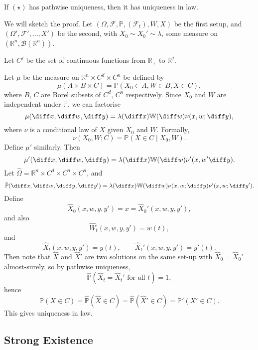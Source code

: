 \documentclass[12pt]{article}
\begin{document}
\begin{theorem}
	If $(\star)$ has pathwise uniqueness, then it has uniqueness in law.
\end{theorem}

\begin{proofbox}
	We will sketch the proof. Let $(\Omega, \mathcal{F}, \mathbb{P}, (\mathcal{F}_t), W, X)$ be the first setup, and $(\Omega', \mathcal{F}', \ldots, X')$ be the second, with $X_0 \sim X_0' \sim \lambda$, some measure on $(\mathbb{R}^{n}, \mathcal{B}(\mathbb{R}^{n}))$.

	Let $C^{j}$ be the set of continuous functions from $\mathbb{R}_+$ to $\mathbb{R}^{j}$.

	Let $\mu$ be the measure on $\mathbb{R}^{n} \times C^{d} \times C^{n}$ be defined by
	\[
		\mu(A \times B \times C) = \mathbb{P}(X_0 \in A, W \in B, X \in C),
	\]
	where $B$, $C$ are Borel subsets of $C^{d}$, $C^{n}$ respectively. Since $X_0$ and $W$ are independent under $\mathbb{P}$, we can factorise
	\[
	\mu(\diff x, \diff w, \diff y) = \lambda(\diff x) \mathbb{W} (\diff w) \nu(x, w; \diff y),
	\]
	where $\nu$ is a conditional law of $X$ given $X_0$ and $W$. Formally, 
	\[
	\nu(X_0, W; C) = \mathbb{P}(X \in C \mid X_0, W).
	\]
	Define $\mu'$ similarly. Then
	\[
	\mu'(\diff x, \diff w, \diff y) = \lambda(\diff x) \mathbb{W}(\diff w) \nu'(x, w' \diff y).
	\]
	Let $\hat{\Omega} = \mathbb{R}^{n} \times C^{d} \times C^{n} \times C^{n}$, and
	\[
		\hat{\mathbb{P}}(\diff x, \diff w, \diff y, \diff y') = \lambda(\diff x) \mathbb{W}(\diff w) \nu(x, w; \diff y) \nu'(x, w; \diff y').
	\]
	Define
	\[
	\hat X_0(x, w, y, y') = x = \hat X_0'(x, w, y, y'),
	\]
	and also
	\[
	\hat W_t(x, w, y, y') = w(t),
	\]
	and
	\[
	\hat X_t (x, w, y, y') = y(t), \qquad \hat X_t'(x, w, y, y') = y'(t).
	\]
	Then note that $\hat X$ and $\hat X'$ are two solutions on the same set-up with $\hat X_0 = \hat X_0'$ almost-surely, so by pathwise uniqueness, 
	\[
		\hat{\mathbb{P}} (\hat X_t = \hat X_t' \text{ for all } t) = 1,
	\]
	hence
	\[
		\mathbb{P}(X \in C) = \hat{\mathbb{P}}(\hat X \in C) = \hat{\mathbb{P}}(\hat X' \in C) = \mathbb{P}'(X' \in C).
	\]
	This gives uniqueness in law.
\end{proofbox}


\subsection{Strong Existence}%
\label{sub:se}
\end{document}
